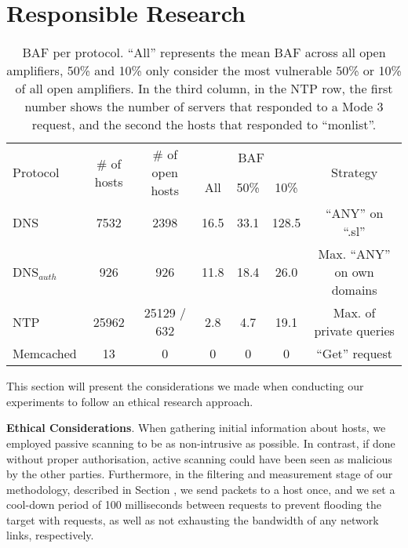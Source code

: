 \section{Responsible Research}



\captionsetup{font=scriptsize}
\begin{table}[t]
    \raggedright %
    \caption{BAF per protocol. ``All'' represents the mean BAF across all open amplifiers, 50\% and 10\% only consider the most vulnerable 50\% or 10\% of all open amplifiers. In the third column, in the NTP row, the first number shows the number of servers that responded to a Mode 3 request, and the second the hosts that responded to ``monlist''.}
    \scriptsize %
    \renewcommand{\arraystretch}{0.8} %
    \setlength{\tabcolsep}{1.3pt} %
    \begin{tabular}{lcccccc}
        \toprule
        \multirow{2}{*}{Protocol} & \multirow{2}{*}{\# of hosts} & \multirow{2}{*}{\# of open hosts} & \multicolumn{3}{c}{BAF} & \multirow{2}{*}{Strategy} \\
        \cmidrule(r){4-6}
         &  &  & All & 50\% & 10\% &  \\
        \midrule
        DNS & 7532 & 2398 & 16.5 & 33.1 & 128.5 & ``ANY'' on ``.sl'' \\
        DNS\(_{auth}\) & 926 & 926 & 11.8 & 18.4 & 26.0 & Max. ``ANY'' on own domains\\
        NTP & 25962 & 25129 / 632 & 2.8 & 4.7 & 19.1 & Max. of private queries\\
        Memcached & 13 & 0 & 0 & 0 & 0 & ``Get'' request \\
        \bottomrule
    \end{tabular}
    \label{tab:hosts_baf}
\end{table}

 This section will present the considerations we made when conducting our experiments to follow an ethical research approach. 

 \textbf{Ethical Considerations}. When gathering initial information about hosts, we employed passive scanning to be as non-intrusive as possible. In contrast, if done without proper authorisation, active scanning could have been seen as malicious by the other parties. Furthermore, in the filtering and measurement stage of our methodology, described in Section , we send packets to a host once, and we set a cool-down period of 100 milliseconds between requests to prevent flooding the target with requests, as well as not exhausting the bandwidth of any network links, respectively. 

